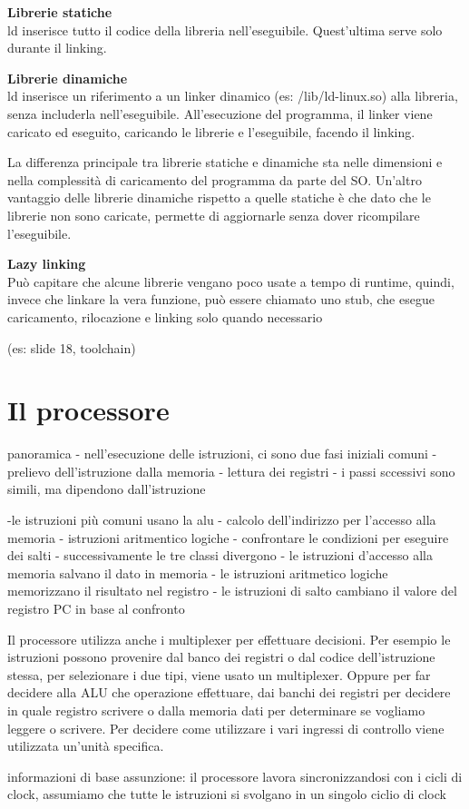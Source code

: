 \documentclass[12pt, a4paper]{article}
\begin{document}
\textbf{Librerie statiche}\\ ld inserisce tutto il codice della libreria nell'eseguibile. Quest'ultima serve solo 
durante il linking. 

\textbf{Librerie dinamiche}\\ ld inserisce un riferimento a un linker dinamico (es: /lib/ld-linux.so) alla libreria,
senza includerla nell'eseguibile. All'esecuzione del programma, il linker viene caricato ed eseguito, caricando le 
librerie e l'eseguibile, facendo il linking.

La differenza principale tra librerie statiche e dinamiche sta nelle dimensioni e nella complessità di caricamento
del programma da parte del SO. Un'altro vantaggio delle librerie dinamiche rispetto a quelle statiche è che dato che 
le librerie non sono caricate, permette di aggiornarle senza dover ricompilare l'eseguibile.

\textbf{Lazy linking}\\ Può capitare che alcune librerie vengano poco usate a tempo di runtime, quindi, invece che
linkare la vera funzione, può essere chiamato uno stub, che esegue caricamento, rilocazione e linking solo quando 
necessario

(es: slide 18, toolchain)

\newpage
\section{Il processore}

panoramica
- nell'esecuzione delle istruzioni, ci sono due fasi iniziali comuni
 - prelievo dell'istruzione dalla memoria
 - lettura dei registri
- i passi sccessivi sono simili, ma dipendono dall'istruzione

-le istruzioni più comuni usano la alu 
 - calcolo dell'indirizzo per l'accesso alla memoria
 - istruzioni aritmentico logiche
 - confrontare le condizioni per eseguire dei salti
- successivamente le tre classi divergono
 - le istruzioni d'accesso alla memoria salvano il dato in memoria
 - le istruzioni aritmetico logiche memorizzano il risultato nel registro
 - le istruzioni di salto cambiano il valore del registro PC in base al confronto

Il processore utilizza anche i multiplexer per effettuare decisioni. Per esempio le istruzioni
possono provenire dal banco dei registri o dal codice dell'istruzione stessa, per selezionare
i due tipi, viene usato un multiplexer. Oppure per far decidere alla ALU che operazione effettuare,
dai banchi dei registri per decidere in quale registro scrivere o dalla memoria dati per determinare
se vogliamo leggere o scrivere. Per decidere come utilizzare i vari ingressi di controllo viene 
utilizzata un'unità specifica.

informazioni di base
assunzione: il processore lavora sincronizzandosi con i cicli di clock, assumiamo che tutte le 
  istruzioni si svolgano in un singolo ciclio di clock
\end{document}
